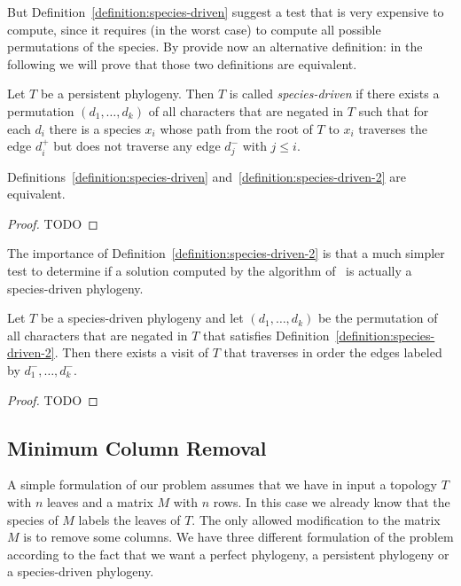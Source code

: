 But Definition~\ref{definition:species-driven} suggest a test that is
very expensive to compute, since it requires (in the worst case) to
compute all possible permutations of the species.
By provide now an alternative definition: in the following we will
prove that those two definitions are equivalent.


\begin{definition}
\label{definition:species-driven-2}
Let $T$ be a persistent phylogeny.
Then $T$ is called \emph{species-driven} if there exists a permutation
$(d_{1}, \ldots , d_{k})$ of all characters that are negated in $T$
such that for each $d_{i}$ there is a species $x_{i}$ whose path from
the root of $T$ to $x_{i}$ traverses the edge $d_{i}^{+}$ but does not
traverse any edge $d_{j}^{-}$ with $j \le i$.
\end{definition}

\begin{lemma}
\label{lemma:equivalent-species-driven}
Definitions~\ref{definition:species-driven}
and~\ref{definition:species-driven-2} are equivalent.
\end{lemma}

\begin{proof}
TODO
\end{proof}

The importance of Definition~\ref{definition:species-driven-2} is that
a much simpler test to determine if a solution computed by the
algorithm of~\cite{bonizzoni_explaining_2014} is actually a
species-driven phylogeny.

\begin{lemma}
\label{lemma:same-order-of-algorithm-for-species-driven-test}
Let $T$ be a species-driven phylogeny and let $(d_{1}, \ldots,
d_{k})$ be the permutation of all characters that are negated in $T$
that satisfies Definition~\ref{definition:species-driven-2}.
Then there exists a visit of $T$ that traverses in order the edges
labeled by $d_{1}^{-}, \ldots, d_{k}^{-}$.
\end{lemma}

\begin{proof}
TODO
\end{proof}

\subsection*{Minimum Column Removal}

A simple formulation of our problem assumes that we have in input a
topology $T$ with $n$ leaves and a matrix $M$ with $n$ rows.
In this case we already know that the species of $M$ labels the leaves
of $T$.
The only allowed modification to the matrix $M$ is to remove some columns.
We have three different formulation of the problem according to the
fact that we want a perfect phylogeny, a persistent phylogeny or a
species-driven phylogeny.


